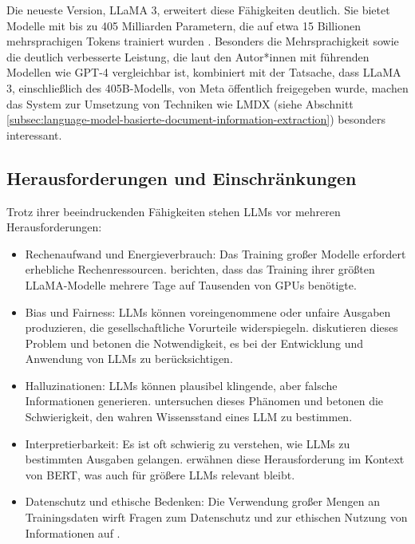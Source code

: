 Die neueste Version, LLaMA 3, erweitert diese Fähigkeiten deutlich. Sie bietet Modelle mit bis zu 405 Milliarden Parametern, die auf etwa 15 Billionen mehrsprachigen Tokens trainiert wurden \cite{HartshornAnthony2024TL3H}. Besonders die Mehrsprachigkeit sowie die deutlich verbesserte Leistung, die laut den Autor*innen mit führenden Modellen wie GPT-4 vergleichbar ist, kombiniert mit der Tatsache, dass LLaMA 3, einschließlich des 405B-Modells, von Meta öffentlich freigegeben wurde, machen das System zur Umsetzung von Techniken wie \gls{LMDX} (siehe Abschnitt \ref{subsec:language-model-basierte-document-information-extraction}) besonders interessant.

\subsection{Herausforderungen und Einschränkungen}
\label{subsec:llm-challenges}

Trotz ihrer beeindruckenden Fähigkeiten stehen \glspl{LLM} vor mehreren Herausforderungen:

\begin{itemize}
	\item Rechenaufwand und Energieverbrauch: Das Training großer Modelle erfordert erhebliche Rechenressourcen. \textcite{TouvronHugo2023LOaE} berichten, dass das Training ihrer größten LLaMA-Modelle mehrere Tage auf Tausenden von GPUs benötigte.
	\item Bias und Fairness: \glspl{LLM} können voreingenommene oder unfaire Ausgaben produzieren, die gesellschaftliche Vorurteile widerspiegeln. \textcite{BrownTomB2020LMaF} diskutieren dieses Problem und betonen die Notwendigkeit, es bei der Entwicklung und Anwendung von \glspl{LLM} zu berücksichtigen.
	\item Halluzinationen: \glspl{LLM} können plausibel klingende, aber falsche Informationen generieren. \textcite{JiangZhengbao2020HCWK} untersuchen dieses Phänomen und betonen die Schwierigkeit, den wahren Wissensstand eines \gls{LLM} zu bestimmen.
	\item Interpretierbarkeit: Es ist oft schwierig zu verstehen, wie \glspl{LLM} zu bestimmten Ausgaben gelangen. \textcite{DevlinJacob2019BPoD} erwähnen diese Herausforderung im Kontext von BERT, was auch für größere \glspl{LLM} relevant bleibt.
	\item Datenschutz und ethische Bedenken: Die Verwendung großer Mengen an Trainingsdaten wirft Fragen zum Datenschutz und zur ethischen Nutzung von Informationen auf \cite{TouvronHugo2023LOaE}.
\end{itemize}

